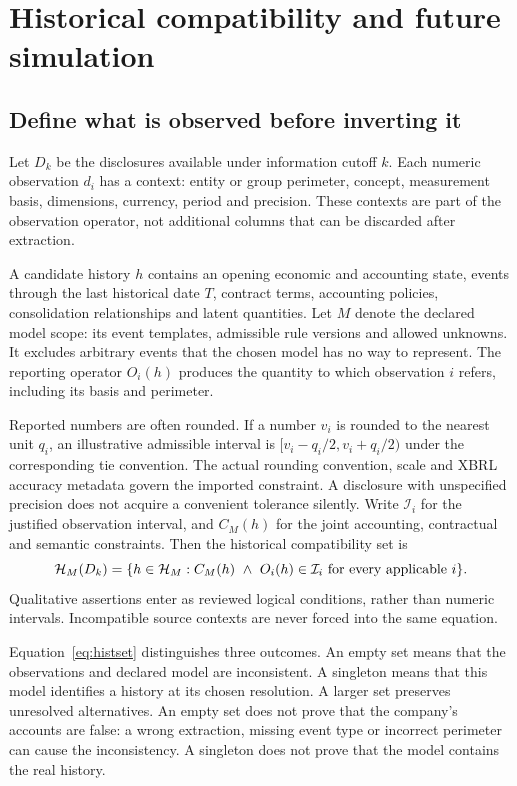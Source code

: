 \chapter{Historical compatibility and future simulation}
\label{ch:math}

\section{Define what is observed before inverting it}

Let $D_k$ be the disclosures available under information cutoff $k$. Each
numeric observation $d_i$ has a context: entity or group perimeter, concept,
measurement basis, dimensions, currency, period and precision. These contexts
are part of the observation operator, not additional columns that can be
discarded after extraction.

A candidate history $h$ contains an opening economic and accounting state,
events through the last historical date $T$, contract terms, accounting
policies, consolidation relationships and latent quantities. Let $M$ denote
the declared model scope: its event templates, admissible rule versions and
allowed unknowns. It excludes arbitrary events that the chosen model has no
way to represent. The reporting operator $O_i(h)$ produces the quantity to
which observation $i$ refers, including its basis and perimeter.

Reported numbers are often rounded. If a number $v_i$ is rounded to the nearest
unit $q_i$, an illustrative admissible interval is
$[v_i-q_i/2,v_i+q_i/2)$ under the corresponding tie convention. The actual
rounding convention, scale and XBRL accuracy metadata govern the imported
constraint. A disclosure with unspecified precision does not acquire a
convenient tolerance silently. Write $\mathcal{I}_i$ for the justified
observation interval, and $C_M(h)$ for the joint accounting, contractual and
semantic constraints. Then the historical compatibility set is
\begin{equation}\label{eq:histset}
 \mathcal{H}_M(D_k)=\{h\in\mathcal{H}_M:
 C_M(h)\ \land\ O_i(h)\in\mathcal{I}_i\text{ for every applicable }i\}.
\end{equation}
Qualitative assertions enter as reviewed logical conditions, rather than
numeric intervals. Incompatible source contexts are never forced into the
same equation.

Equation~\eqref{eq:histset} distinguishes three outcomes. An empty set means
that the observations and declared model are inconsistent. A singleton means
that this model identifies a history at its chosen resolution. A larger set
preserves unresolved alternatives. An empty set does not prove that the
company's accounts are false: a wrong extraction, missing event type or
incorrect perimeter can cause the inconsistency. A singleton does not prove
that the model contains the real history.

